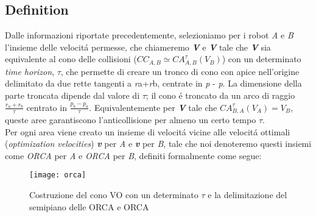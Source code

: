 \subsection{Definition}
Dalle informazioni riportate precedentemente, selezioniamo per i robot \textit{A} e \textit{B} l'insieme delle velocit\'a permesse, che chiameremo {\bfseries\textit{V}} e {\bfseries\textit{V}}  tale che {\bfseries\textit{V}} sia equivalente al cono delle collisioni (${CC}_{A,B}\simeq CA^\tau_{A,B}(V_B)$) con un determinato \textit{time horizon}, {$\tau$}, che permette di creare un tronco di cono con apice nell'origine delimitato da due rette tangenti  a \textit{r}\ped a+\textit{r}\ped b, centrate in \textit{p} - \textit{p}. La dimensione della parte troncata dipende dal valore di $\tau$; il cono \'e troncato da un arco di raggio $\frac{r_a+r_b}{\tau}$ centrato in $\frac{p_b-p_a}{\tau}$. Equivalentemente per {\bfseries\textit{V}} tale che $CA^\tau_{B,A}(V_A)={V}_{B}$, queste aree garantiscono l'anticollisione per almeno un certo tempo $\tau$. 
\\Per ogni area viene creato un insieme di velocit\'a vicine alle velocit\'a ottimali (\textit{optimization velocities}) {\bfseries\textit{v}} per \textit{A} e {\bfseries\textit{v}} per \textit{B}, tale che noi denoteremo questi insiemi come \textit{ORCA}\ap{$\tau$} per \textit{A} e \textit{ORCA}\ap{$\tau$} per \textit{B}, definiti formalmente come segue:

\begin{figure}
\centering 
\texttt{[image: orca]} 
\caption[Costruzione del cono VO con un determinato $\tau$ e la delimitazione del semipiano delle ORCA e ORCA]{Costruzione del cono VO con un determinato $\tau$ e la delimitazione del semipiano delle ORCA e ORCA}
\label{fig:orca} 
\end{figure}

